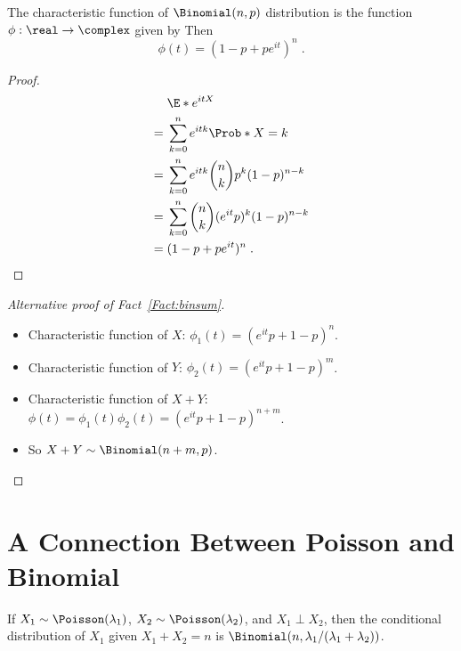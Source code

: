 \filbreak

\begin{fact}
The characteristic function of $\Binomial(n,p)$ distribution is the function $\phi:\real\to\complex$ given by  
Then    
\[
\phi(t) = \left(1-p+pe^{it}\right)^n\;.
\]
\end{fact}

\begin{proof}
\begin{align*}
 &  \E*{e^{itX}}\\
={}&\sum_{k=0}^n e^{itk} \Prob*{X=k}\\
={}&\sum_{k=0}^n e^{itk} \binom{n}{k} p^k (1-p)^{n-k}\\
={}&\sum_{k=0}^n \binom{n}{k} (e^{it}p)^k (1-p)^{n-k}\\
={}&(1-p+pe^{it})^n\;.
\end{align*}
\end{proof}


\begin{proof}[Alternative proof of Fact~\ref{Fact:binsum}]
\;
\begin{itemize}
\item Characteristic function of $X$: $\phi_1(t)=(e^{it}p+1-p)^n$.
\item Characteristic function of $Y$: $\phi_2(t)=(e^{it}p+1-p)^m$.
\item Characteristic function of $X+Y$: $\phi(t)=\phi_1(t) \phi_2(t) = (e^{it}p+1-p)^{n+m}$.
\item So $X+Y\sim\Binomial(n+m,p)$.
\end{itemize}
\end{proof}

\filbreak

\section{A Connection Between Poisson and Binomial}

\begin{fact}
If $X_1\sim\Poisson(\lambda_1)$, $X_2\sim\Poisson(\lambda_2)$, and $X_1\perp X_2$, then the conditional distribution of $X_1$ given $X_1+X_2=n$ is $\Binomial(n,\lambda_1/(\lambda_1+\lambda_2))$.
\end{fact}

